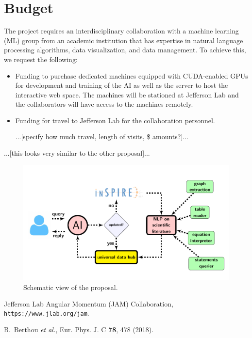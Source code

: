 \documentclass{article}[12pt,preprint]
\begin{document}
\section{Budget}

The project requires an interdisciplinary collaboration with a
machine learning (ML) group from an academic institution that
has expertise in natural language processing algorithms, data
visualization, and data management.  To achieve this, we request
the following:

\begin{itemize}

\item
Funding to purchase dedicated machines equipped with CUDA-enabled
GPUs for development and training of the AI as well as the
server to host the interactive web space.  The machines will be
stationed at Jefferson Lab and the collaborators will have access
to the machines remotely.

\item
Funding for travel to Jefferson Lab for the collaboration personnel.

{\color{red} ...[specify how much travel, length of visits,
\$ amounts?]...}

\end{itemize}

{\color{red} ...[this looks very similar to the other proposal]...}



\begin{figure}[!h]
\centering
\includegraphics[width=1\textwidth, angle=0]{gallery/ai}  
\caption{Schematic view of the proposal.}
\label{f.1}
\end{figure}

\begin{thebibliography}{99}

Jefferson Lab Angular Momentum (JAM) Collaboration,
{\tt https://www.jlab.org/jam}.

B.~Berthou {\it et al.},
Eur. Phys. J. C {\bf 78}, 478 (2018).

\end{thebibliography}
\end{document}
